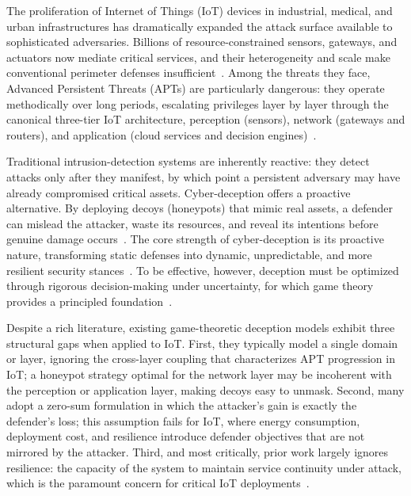 \documentclass[conference]{IEEEtran}
\begin{document}
The proliferation of Internet of Things (IoT) devices in industrial,
medical, and urban infrastructures has dramatically expanded the attack
surface available to sophisticated adversaries. Billions of resource-constrained
sensors, gateways, and actuators now mediate critical services, and their
heterogeneity and scale make conventional perimeter defenses
insufficient~\cite{pawlick2019}. Among the threats they face, Advanced
Persistent Threats (APTs) are particularly dangerous: they operate methodically
over long periods, escalating privileges layer by layer through the canonical
three-tier IoT architecture, perception (sensors), network (gateways and
routers), and application (cloud services and decision engines)~\cite{wan2022}.

Traditional intrusion-detection systems are inherently reactive: they detect
attacks only after they manifest, by which point a persistent adversary may
have already compromised critical assets. Cyber-deception offers a
proactive alternative. By deploying decoys (honeypots) that mimic real assets,
a defender can mislead the attacker, waste its resources, and reveal its
intentions before genuine damage occurs~\cite{anwar2020,sayed2023}. The core
strength of cyber-deception is its proactive nature, transforming static
defenses into dynamic, unpredictable, and more resilient security
stances~\cite{asghar2025}. To be effective, however, deception must be
optimized through rigorous decision-making under uncertainty, for which game
theory provides a principled foundation~\cite{huang2019}.

Despite a rich literature, existing game-theoretic deception models exhibit
three structural gaps when applied to IoT. First, they typically
model a single domain or layer, ignoring the cross-layer coupling that
characterizes APT progression in IoT; a honeypot strategy optimal for the
network layer may be incoherent with the perception or application layer,
making decoys easy to unmask. Second, many adopt a zero-sum
formulation in which the attacker's gain is exactly the defender's loss; this
assumption fails for IoT, where energy consumption, deployment cost, and
resilience introduce defender objectives that are not mirrored by the attacker.
Third, and most critically, prior work largely ignores
resilience: the capacity of the system to maintain service continuity
under attack, which is the paramount concern for critical IoT
deployments~\cite{he2026}.
\end{document}
